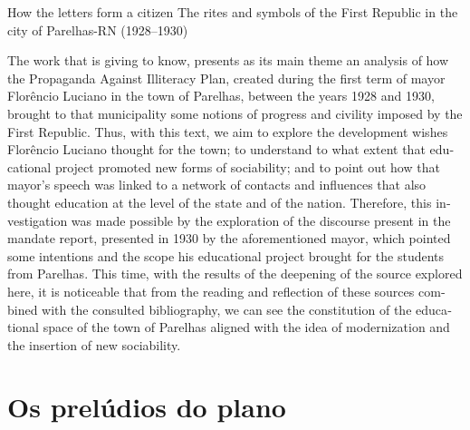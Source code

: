 \begin{refsection}

\begin{otherlanguage}{english}

\fakeChapterTwoLines
{How the letters form a citizen}
{The rites and symbols of the First Republic in the city of Parelhas-RN (1928--1930)}

\begin{galoResumo}[Abstract]
    The work that is giving to know, presents as its main theme an analysis of how the Propaganda Against Illiteracy Plan, created during the first term of mayor Florêncio Luciano in the town of Parelhas, between the years 1928 and 1930, brought to that municipality some notions of progress and civility imposed by the First Republic. Thus, with this text, we aim to explore the development wishes Florêncio Luciano thought for the town; to understand to what extent that educational project promoted new forms of sociability; and to point out how that mayor's speech was linked to a network of contacts and influences that also thought education at the level of the state and of the nation. Therefore, this investigation was made possible by the exploration of the discourse present in the mandate report, presented in 1930 by the aforementioned mayor, which pointed some intentions and the scope his educational project brought for the students from Parelhas. This time, with the results of the deepening of the source explored here, it is noticeable that from the reading and reflection of these sources combined with the consulted bibliography, we can see the constitution of the educational space of the town of Parelhas aligned with the idea of modernization and the insertion of new sociability.
\end{galoResumo}

\end{otherlanguage}

\section{Os prelúdios do plano}

\label{chap:decomoasletrasend}

\end{refsection}
